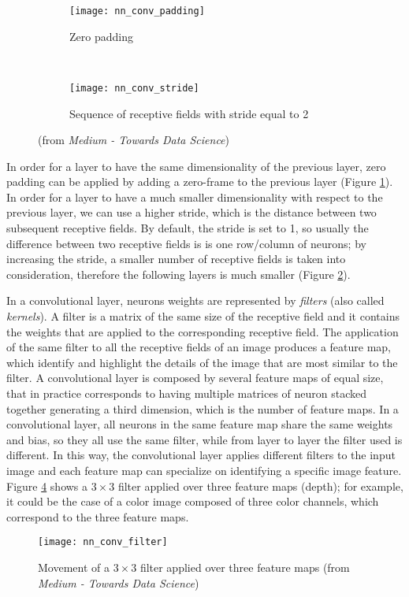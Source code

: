 \begin{figure}[htbp]
    \centering
    \begin{subfigure}[t]{0.3\textwidth}
		\texttt{[image: nn\_conv\_padding]}
        \caption{Zero padding}
        \label{fig:nn_conv_padding}
	\end{subfigure}
	~
	\begin{subfigure}[t]{1\textwidth}
		\texttt{[image: nn\_conv\_stride]}
        \caption{Sequence of receptive fields with stride equal to 2}
        \label{fig:nn_conv_stride}
    \end{subfigure}
    \caption{(from \textit{Medium - Towards Data Science})}
    \label{fig:padding_stride}
\end{figure}

In order for a layer to have the same dimensionality of the previous layer, zero padding can be applied by adding a zero-frame to the previous layer (Figure \ref{fig:nn_conv_padding}). In order for a layer to have a much smaller dimensionality with respect to the previous layer, we can use a higher stride, which is the distance between two subsequent receptive fields. By default, the stride is set to 1, so usually the difference between two receptive fields is is one row/column of neurons; by increasing the stride, a smaller number of receptive fields is taken into consideration, therefore the following layers is much smaller (Figure \ref{fig:nn_conv_stride}).

In a convolutional layer, neurons weights are represented by \textit{filters} (also called \textit{kernels}). A filter is a matrix of the same size of the receptive field and it contains the weights that are applied to the corresponding receptive field. The application of the same filter to all the receptive fields of an image produces a feature map, which identify and highlight the details of the image that are most similar to the filter. A convolutional layer is composed by several feature maps of equal size, that in practice corresponds to having multiple matrices of neuron stacked together generating a third dimension, which is the number of feature maps. In a convolutional layer, all neurons in the same feature map share the same weights and bias, so they all use the same filter, while from layer to layer the filter used is different. In this way, the convolutional layer applies different filters to the input image and each feature map can specialize on identifying a specific image feature. Figure \ref{fig:nn_conv_filter} shows a $3\times3$ filter applied over three feature maps (depth); for example, it could be the case of a color image composed of three color channels, which correspond to the three feature maps.
\begin{figure}[htbp]
    \centering
    \texttt{[image: nn\_conv\_filter]}
    \caption{Movement of a $3\times3$ filter applied over three feature maps (from \textit{Medium - Towards Data Science})}
    \label{fig:nn_conv_filter}
\end{figure}

